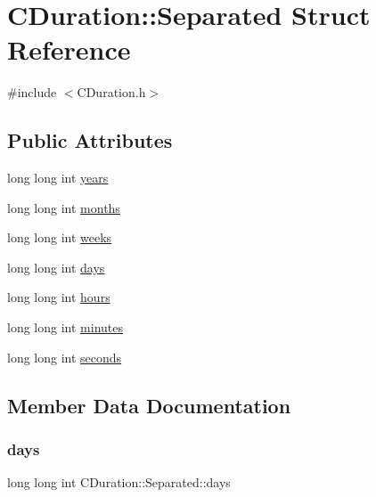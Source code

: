 \hypertarget{struct_c_duration_1_1_separated}{}\section{C\+Duration\+:\+:Separated Struct Reference}
\label{struct_c_duration_1_1_separated}


{\ttfamily \#include $<$C\+Duration.\+h$>$}

\subsection*{Public Attributes}
\begin{DoxyCompactItemize}
\item 
long long int \mbox{\hyperlink{struct_c_duration_1_1_separated_acbdcab6679092f3db70f9bc804757764}{years}}
\item 
long long int \mbox{\hyperlink{struct_c_duration_1_1_separated_afa838287265025d66478f6c2be9795b4}{months}}
\item 
long long int \mbox{\hyperlink{struct_c_duration_1_1_separated_ac4b83435c7d0e87d5335a20039b01753}{weeks}}
\item 
long long int \mbox{\hyperlink{struct_c_duration_1_1_separated_ac2dc46b006d0b613c72558c325a847c8}{days}}
\item 
long long int \mbox{\hyperlink{struct_c_duration_1_1_separated_a15c891acabf59f674ea756cc8a567d06}{hours}}
\item 
long long int \mbox{\hyperlink{struct_c_duration_1_1_separated_ab5def9b56f227359f798fe02d1b688ca}{minutes}}
\item 
long long int \mbox{\hyperlink{struct_c_duration_1_1_separated_ae3682ffed4c8577cd77185ace9d21fcf}{seconds}}
\end{DoxyCompactItemize}


\subsection{Member Data Documentation}
\mbox{\label{struct_c_duration_1_1_separated_ac2dc46b006d0b613c72558c325a847c8}} 
\subsubsection{\texorpdfstring{days}{days}}
{\footnotesize\ttfamily long long int C\+Duration\+::\+Separated\+::days}

